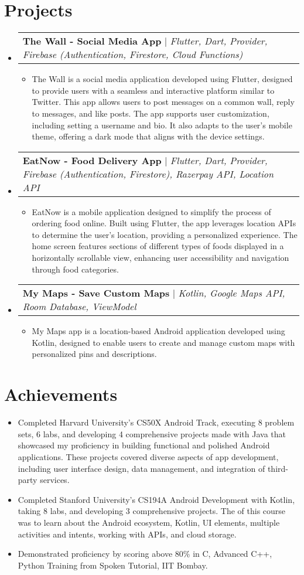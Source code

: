 \documentclass[letterpaper,11pt]{article}
\makeatletter
\newcommand{\resumeItem}[1]{
  \item\small{
    {#1 \vspace{-2pt}}
  }
}
\newcommand{\resumeProjectHeading}[2]{
    \item
    \begin{tabular*}{0.97\textwidth}{l@{\extracolsep{\fill}}r}
      \small#1 & #2 \\
    \end{tabular*}\vspace{-7pt}
}
\newcommand{\resumeSubHeadingListStart}{\begin{itemize}[leftmargin=0.15in, label={}]}
\newcommand{\resumeSubHeadingListEnd}{\end{itemize}}
\newcommand{\resumeItemListStart}{\begin{itemize}}
\newcommand{\resumeItemListEnd}{\end{itemize}\vspace{-5pt}}
\makeatother
\begin{document}
\section{Projects}
    \resumeSubHeadingListStart
      \resumeProjectHeading
          {\textbf{The Wall - Social Media App} $|$ \emph{Flutter, Dart, Provider, Firebase (Authentication, Firestore, Cloud Functions)}}{}
          \resumeItemListStart
            \resumeItem{The Wall is a social media application developed using Flutter, designed to provide users with a seamless and interactive platform similar to Twitter. This app allows users to post messages on a common wall, reply to messages, and like posts. The app supports user customization, including setting a username and bio. It also adapts to the user's mobile theme, offering a dark mode that aligns with the device settings.}
          \resumeItemListEnd
      \resumeProjectHeading
          {\textbf{EatNow - Food Delivery App} $|$ \emph{Flutter, Dart, Provider, Firebase (Authentication, Firestore), Razerpay API, Location API}}{}
          \resumeItemListStart
            \resumeItem{EatNow is a mobile application designed to simplify the process of ordering food online. Built using Flutter, the app leverages location APIs to determine the user's location, providing a personalized experience. The home screen features sections of different types of foods displayed in a horizontally scrollable view, enhancing user accessibility and navigation through food categories.}
          \resumeItemListEnd
     \resumeProjectHeading
          {\textbf{My Maps - Save Custom Maps} $|$ \emph{Kotlin, Google Maps API, Room Database, ViewModel}}{}
          \resumeItemListStart
            \resumeItem{My Maps app is a location-based Android application developed using Kotlin, designed to enable users to create and manage custom maps with personalized pins and descriptions.}
          \resumeItemListEnd
    \resumeSubHeadingListEnd
%

\section{Achievements}
\resumeItemListStart
            \resumeItem{Completed Harvard University's CS50X Android Track, executing 8 problem sets, 6 labs, and developing 4 comprehensive projects made with Java that showcased my proficiency in building functional and polished Android applications. These projects covered diverse aspects of app development, including user interface design, data management, and integration of third-party services.}
            \resumeItem{Completed Stanford University's CS194A Android Development with Kotlin, taking 8 labs, and developing 3 comprehensive projects. The of this course was to learn about the Android ecosystem, Kotlin, UI elements, multiple activities and intents, working with APIs, and cloud storage.}
            \resumeItem{Demonstrated proficiency by scoring above 80\% in C, Advanced C++, Python Training from Spoken Tutorial, IIT Bombay.}
        \resumeItemListEnd
%


\end{document}
